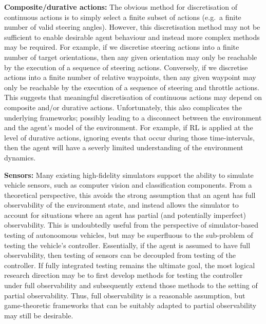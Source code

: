 \documentclass[10pt]{article}
\theoremstyle{plain}
\newenvironment{note}[1][]{\par\smallskip\noindent\textbf{#1}\rmfamily}{\smallskip}
\begin{document}
\begin{note}[Composite/durative actions:]
    The obvious method for discretisation of continuous actions is to simply select a finite subset of actions (e.g.\ a finite number of valid steering angles).
    However, this discretisation method may not be sufficient to enable desirable agent behaviour and instead more complex methods may be required.
    For example, if we discretise steering actions into a finite number of target orientations, then any given orientation may only be reachable by the execution of a sequence of steering actions.
    Conversely, if we discretise actions into a finite number of relative waypoints, then any given waypoint may only be reachable by the execution of a sequence of steering and throttle actions.
    This suggests that meaningful discretisation of continuous actions may depend on composite and/or durative actions.
    Unfortunately, this also complicates the underlying frameworks; possibly leading to a disconnect between the environment and the agent's model of the environment.
    For example, if RL is applied at the level of durative actions, ignoring events that occur during those time-intervals, then the agent will have a severly limited understanding of the environment dynamics.
\end{note}

\begin{note}[Sensors:]
    Many existing high-fidelity simulators support the ability to simulate vehicle sensors, such as computer vision and classification components.
    From a theoretical perspective, this avoids the strong assumption that an agent has full observability of the environment state, and instead allows the simulator to account for situations where an agent has partial (and potentially imperfect) observability.
    This is undoubtedly useful from the perspective of simulator-based testing of autonoomous vehicles, but may be superfluous to the sub-problem of testing the vehicle's controller.
    Essentially, if the agent is assumed to have full observability, then testing of sensors can be decoupled from testing of the controller.
    If fully integrated testing remains the ultimate goal, the most logical research direction may be to first develop methods for testing the controller under full observability and subsequently extend those methods to the setting of partial observability.
    Thus, full observability is a reasonable assumption, but game-theoretic frameworks that can be suitably adapted to partial observability may still be desirable.
\end{note}
\end{document}
